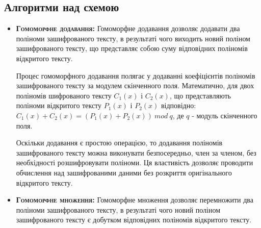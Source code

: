 \subsection{Алгоритми над схемою}
\begin{itemize}
\item{\textsc{\textbf{Гомоморфне додавання:}}
    Гомоморфне додавання дозволяє додавати два поліноми зашифрованого тексту, в результаті
    чого виходить новий поліном зашифрованого тексту, що представляє собою суму відповідних
    поліномів відкритого тексту.

    Процес гомоморфного додавання полягає у додаванні коефіцієнтів поліномів зашифрованого
    тексту за модулем скінченного поля. Математично, для двох поліномів шифрованого тексту
    \(C_1(x)\) і \(C_2(x)\), що представляють поліноми відкритого тексту \(P_1(x)\) і 
    \(P_2(x)\) відповідно:
    \begin{math}
        C_1(x) + C_2(x) = (P_1(x) + P_2(x))\ mod\ q
    \end{math}, де \(q\) - модуль скінченного поля.

    Оскільки додавання є простою операцією, то додавання поліномів зашифрованого тексту
    можна виконувати безпосередньо, член за членом, без необхідності розшифровувати
    поліноми. Ця властивість дозволяє проводити обчислення над зашифрованими даними без
    розкриття оригінального відкритого тексту.
}
\item{\textsc{\textbf{Гомоморфне множення:}}
    Гомоморфне множення дозволяє перемножити два поліноми зашифрованого тексту, в
    результаті чого новий поліном зашифрованого тексту є добутком відповідних поліномів
    відкритого тексту.

}
\end{itemize}
